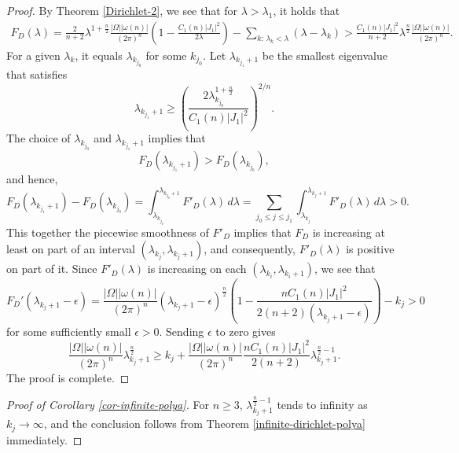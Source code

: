 \documentclass[11pt,twoside, leqno]{article}
\numberwithin{equation}{section}
\begin{document}
\begin{proof}
By Theorem \ref{Dirichlet-2}, we see that for $\lambda>\lambda_1$, it holds that
\begin{align}
F_D(\lambda)= \frac{2}{n+2} \lambda^{1+\frac n2} \frac{|\Omega| |\omega(n)|}{(2\pi)^{n}}\left(1 -\frac{C_1(n)|J_1|^2}{2\lambda}\right)-\sum_{k:\,\lambda_k<\lambda}(\lambda-\lambda_k)>  \frac{C_1(n)|J_1|^2}{n+2} \lambda^{\frac n2} \frac{|\Omega| |\omega(n)|}{(2\pi)^{n}}.
\end{align}
For a given $\lambda_k$, it equals $\lambda_{k_{j_0}}$ for some $k_{j_0}$.
Let $\lambda_{k_{j_1}+1}$ be the smallest eigenvalue that satisfies
$$\lambda_{k_{j_1}+1}\ge \left(\frac{2\lambda_{k_{j_0}}^{1+\frac n2}}{C_1(n)|J_1|^2}\right)^{2/n}.$$
The choice of $ \lambda_{k_{j_0}}$ and $\lambda_{k_{j_1}+1}$ implies  that
$$F_D(\lambda_{k_{j_1}+1})>F_D(\lambda_{k_{j_0}}),$$
and hence,
$$F_D(\lambda_{k_{j_1}+1})-F_D(\lambda_{k_{j_0}})=\int_{\lambda_{k_{j_0}}}^{\lambda_{k_{j_0}+1}} F'_D(\lambda)\,d\lambda=\sum_{j_0\le j\le j_1}\int_{\lambda_{k_{j}}}^{\lambda_{k_{j}+1}} F'_D(\lambda)\,d\lambda>0.$$
This together the piecewise smoothness of $F'_D$ implies that $F_D$ is increasing at least on part of an interval $( \lambda_{k_{j}}, \lambda_{k_{j}+1})$,
and consequently, $F'_D(\lambda)$ is positive on part of it. Since $F'_D(\lambda)$ is increasing on each $(\lambda_{k_{i}},\lambda_{k_{i}+1})$,
we see that
$$ F_D'(\lambda_{k_{j}+1}-\epsilon)=\frac{|\Omega| |\omega(n)|}{(2\pi)^{n}}  (\lambda_{k_{j}+1}-\epsilon)^{\frac n2}\left(1-\frac{nC_1(n)|J_1|^2}{2(n+2)(\lambda_{k_{j}+1}-\epsilon)}\right)-k_{j}>0$$
for some sufficiently small $\epsilon>0$.
Sending $\epsilon$ to zero gives
$$\frac{|\Omega| |\omega(n)|}{(2\pi)^{n}}  \lambda_{k_{j}+1}^{\frac n2}\ge k_{j}+\frac{|\Omega| |\omega(n)|}{(2\pi)^{n}} \frac{nC_1(n)|J_1|^2}{2(n+2)}\lambda_{k_{j}+1}^{\frac n2-1}. $$
The proof is complete.
\end{proof}
\begin{proof}[Proof of Corollary \ref{cor-infinite-polya}]
For $n\ge 3$, $\lambda_{k_j+1}^{\frac n2-1}$ tends to infinity as $k_j\to \infty$, and the conclusion follows from Theorem \ref{infinite-dirichlet-polya} immediately.
\end{proof}
\end{document}
